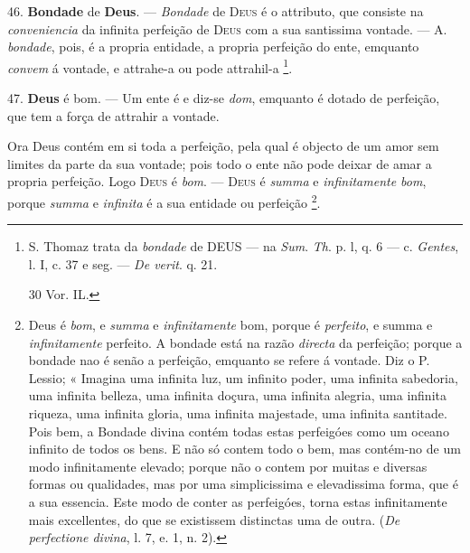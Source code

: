 46. \textbf{Bondade} de \textbf{Deus}. --- \emph{Bondade} de \textsc{Deus} é o attributo, que consiste na \emph{conveniencia} da infinita perfeição de \textsc{Deus} com a sua santissima vontade. --- A. \emph{bondade}, pois, é a propria entidade, a propria perfeição do ente, emquanto \emph{convem} á vontade, e attrahe-a ou pode attrahil-a \footnote{S. Thomaz trata da \emph{bondade} de \textsc{DEUS} --- na \emph{Sum}. \emph{Th}. p. l, q. 6 --- c. \emph{Gentes}, l. I, c. 37 e seg. --- \emph{De verit}. q. 21.\par 30 Vor. IL.}.

47. \textbf{Deus} é bom. --- Um ente é e diz-se \emph{dom}, emquanto é dotado de perfeição, que tem a força de attrahir a vontade.

 Ora Deus contém em si toda a perfeição, pela qual é objecto de um amor sem limites da parte da sua vontade; pois todo o ente não pode deixar de amar a propria perfeição. Logo \textsc{Deus} é \emph{bom}. --- \textsc{Deus} é \emph{summa} e \emph{infinitamente bom}, porque \emph{summa} e \emph{infinita} é a sua entidade ou perfeição \footnote{Deus é \emph{bom}, e \emph{summa} e \emph{infinitamente} bom, porque é \emph{perfeito}, e summa e \emph{infinitamente} perfeito. A bondade está na razão \emph{directa} da perfeição; porque a bondade nao é senão a perfeição, emquanto se refere á vontade. Diz o P. Lessio; « Imagina uma infinita luz, um infinito poder, uma infinita sabedoria, uma infinita belleza, uma infinita doçura, uma infinita alegria, uma infinita riqueza, uma infinita gloria, uma infinita majestade, uma infinita santitade. Pois bem, a Bondade divina contém todas estas perfeigóes como um oceano infinito de todos os bens. E não só contem todo o bem, mas contém-no de um modo infinitamente elevado; porque não o contem por muitas e diversas formas ou qualidades, mas por uma simplicissima e elevadissima forma, que é a sua essencia. Este modo de conter as perfeigóes, torna estas infinitamente mais excellentes, do que se existissem distinctas uma de outra. (\emph{De perfectione divina}, l. 7, e. 1, n. 2).}.

